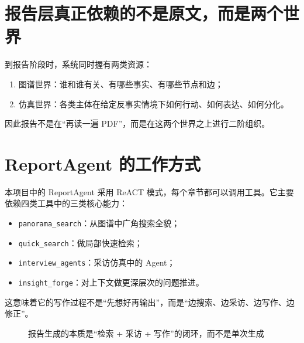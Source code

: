 \documentclass[UTF8,10pt,oneside]{ctexbook}
\newcommand{\code}[1]{\nolinkurl{#1}}
\begin{document}
\section{报告层真正依赖的不是原文，而是两个世界}

到报告阶段时，系统同时握有两类资源：

\begin{enumerate}
  \item 图谱世界：谁和谁有关、有哪些事实、有哪些节点和边；
  \item 仿真世界：各类主体在给定反事实情境下如何行动、如何表达、如何分化。
\end{enumerate}

因此报告不是在“再读一遍 PDF”，而是在这两个世界之上进行二阶组织。

\section{ReportAgent 的工作方式}

本项目中的 ReportAgent 采用 ReACT 模式，每个章节都可以调用工具。它主要依赖四类工具中的三类核心能力：

\begin{itemize}
  \item \code{panorama\_search}：从图谱中广角搜索全貌；
  \item \code{quick\_search}：做局部快速检索；
  \item \code{interview\_agents}：采访仿真中的 Agent；
  \item \code{insight\_forge}：对上下文做更深层次的问题推进。
\end{itemize}

这意味着它的写作过程不是“先想好再输出”，而是“边搜索、边采访、边写作、边修正”。

\begin{figure}[H]
\centering
{}
\caption{报告生成的本质是“检索 + 采访 + 写作”的闭环，而不是单次生成}
\end{figure}
\end{document}
